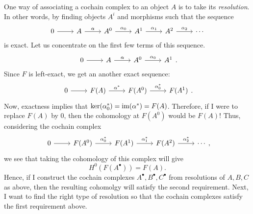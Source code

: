 One way of associating a cochain complex to an object $A$ is to take its
\emph{resolution}. In other words, by finding objects $A^{i}$ and
morphisms such that the sequence
\[\begin{tikzcd}
    0\rar & A\rar{\alpha} & A^{0}\rar{\alpha_{0}} & A^{1}\rar{\alpha_{1}}
    & A^{2}\rar{\alpha_{2}} & \cdots
  \end{tikzcd}\]
is exact. Let us concentrate on the first few terms of this sequence.
\[\begin{tikzcd}
    0\rar & A\rar{\alpha} & A^{0}\rar{\alpha_{0}} & A^{1}
  \end{tikzcd}.\]
Since $F$ is left-exact, we get an another exact sequence:
\[\begin{tikzcd}
    0\rar & F(A)\rar{\alpha^{\ast}}
    & F(A^{0})\rar{\alpha_{0}^{\ast}} & F(A^{1})
  \end{tikzcd}.\]
Now, exactness implies that $\ker(\alpha_{0}^{\ast})=\operatorname{im}(\alpha^{\ast})
=F(A)$. Therefore, if I were to replace $F(A)$ by $0$,
then the cohomology at $F(A^{0})$ would be $F(A)$!
Thus, considering the cochain complex
\[\begin{tikzcd}
    0\rar & F(A^{0})\rar{\alpha_{0}^{\ast}}
    & F(A^{1})\rar{\alpha_{1}^{\ast}}
    & F(A^{2})\rar{\alpha_{2}^{\ast}} & \cdots
  \end{tikzcd},\]
we see that taking the cohomology of this complex will give
\[H^{0}(F(A^{\bullet}))=F(A).\]
Hence, if I construct the cochain complexes $A^{\bullet},B^{\bullet},
C^{\bullet}$ from resolutions of $A,B,C$ as above, then the resulting
cohomolgy will satisfy the second requirement. Next, I want to find the right
type of resolution so that the cochain complexes satisfy the first
requirement above.

